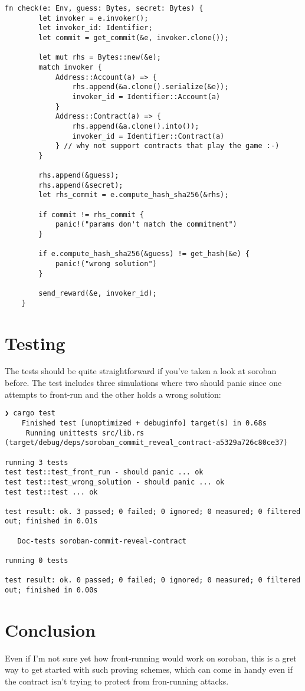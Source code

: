 \documentclass[10pt]{article}
\begin{document}
\begin{verbatim}
fn check(e: Env, guess: Bytes, secret: Bytes) {
        let invoker = e.invoker();
        let invoker_id: Identifier;
        let commit = get_commit(&e, invoker.clone());

        let mut rhs = Bytes::new(&e);
        match invoker {
            Address::Account(a) => {
                rhs.append(&a.clone().serialize(&e));
                invoker_id = Identifier::Account(a)
            }
            Address::Contract(a) => {
                rhs.append(&a.clone().into());
                invoker_id = Identifier::Contract(a)
            } // why not support contracts that play the game :-)
        }

        rhs.append(&guess);
        rhs.append(&secret);
        let rhs_commit = e.compute_hash_sha256(&rhs);

        if commit != rhs_commit {
            panic!("params don't match the commitment")
        }

        if e.compute_hash_sha256(&guess) != get_hash(&e) {
            panic!("wrong solution")
        }

        send_reward(&e, invoker_id);
    }
\end{verbatim}

\section*{Testing}
The tests should be quite straightforward if you've taken a look at soroban before. The test includes three simulations where two should panic since one attempts to front-run and the other holds a wrong solution:

\begin{verbatim}
❯ cargo test                     
    Finished test [unoptimized + debuginfo] target(s) in 0.68s
     Running unittests src/lib.rs (target/debug/deps/soroban_commit_reveal_contract-a5329a726c80ce37)

running 3 tests
test test::test_front_run - should panic ... ok
test test::test_wrong_solution - should panic ... ok
test test::test ... ok

test result: ok. 3 passed; 0 failed; 0 ignored; 0 measured; 0 filtered out; finished in 0.01s

   Doc-tests soroban-commit-reveal-contract

running 0 tests

test result: ok. 0 passed; 0 failed; 0 ignored; 0 measured; 0 filtered out; finished in 0.00s

\end{verbatim}

\section*{Conclusion}
Even if I'm not sure yet how front-running would work on soroban, this is a gret way to get started with such proving schemes, which can come in handy even if the contract isn't trying to protect from fron-running attacks.
\end{document}
